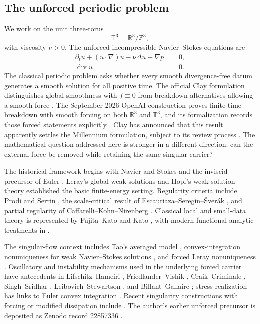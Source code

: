 \documentclass[11pt]{article}
\numberwithin{equation}{section}
\newcommand{\T}{\mathbb T^3}
\newcommand{\R}{\mathbb R}
\newcommand{\diver}{\operatorname{div}}
\begin{document}
\subsection{The unforced periodic problem}
We work on the unit three-torus
\[
\T=\R^3/\mathbb Z^3,
\]
with viscosity \(\nu>0\).  The unforced incompressible Navier--Stokes equations are
\begin{align}
\partial_tu+(u\cdot\nabla)u-\nu\Delta u+\nabla p&=0,\label{eq:NS}\\
\diver u&=0.\label{eq:div}
\end{align}
The classical periodic problem asks whether every smooth divergence-free datum generates a smooth solution for all positive time.  The official Clay formulation distinguishes global smoothness with \(f\equiv0\) from breakdown alternatives allowing a smooth force \cite{FeffermanClay}.  The September 2026 OpenAI construction proves finite-time breakdown with smooth forcing on both \(\R^3\) and \(\T\), and its formalization records those forced statements explicitly \cite{OpenAI2026NS,OpenAIRepo2026}.  Clay has announced that this result apparently settles the Millennium formulation, subject to its review process \cite{ClayAnnouncement2026}.  The mathematical question addressed here is stronger in a different direction: can the external force be removed while retaining the same singular carrier?

The historical framework begins with Navier and Stokes \cite{Navier1827,Stokes1845} and the inviscid precursor of Euler \cite{Euler1757}.  Leray's global weak solutions \cite{Leray1934} and Hopf's weak-solution theory \cite{Hopf1951} established the basic finite-energy setting.  Regularity criteria include Prodi and Serrin \cite{Prodi1959,Serrin1962}, the scale-critical result of Escauriaza--Seregin--\v Sver\'ak \cite{EscauriazaSereginSverak2003}, and partial regularity of Caffarelli--Kohn--Nirenberg \cite{CKN1982}.  Classical local and small-data theory is represented by Fujita--Kato and Kato \cite{FujitaKato1964,Kato1984}, with modern functional-analytic treatments in \cite{Ladyzhenskaya1969,Temam1984,ConstantinFoias1988,Sohr2001,Galdi2011,RobinsonRodrigoSadowski2016}.

The singular-flow context includes Tao's averaged model \cite{Tao2016}, convex-integration nonuniqueness for weak Navier--Stokes solutions \cite{BuckmasterVicol2019}, and forced Leray nonuniqueness \cite{AlbrittonBrueColombo2022}.  Oscillatory and instability mechanisms used in the underlying forced carrier have antecedents in Lifschitz--Hameiri \cite{LifschitzHameiri1991}, Friedlander--Vishik \cite{FriedlanderVishik1991}, Craik--Criminale \cite{CraikCriminale1986}, Singh--Sridhar \cite{SinghSridhar2017}, Leibovich--Stewartson \cite{LeibovichStewartson1983}, and Billant--Gallaire \cite{BillantGallaire2005,BillantGallaire2013}; stress realization has links to Euler convex integration \cite{DaneriSzekelyhidi2017}.  Recent singularity constructions with forcing or modified dissipation include \cite{CordobaMartinezZoroa2023,CordobaMartinezZoroa2024,CordobaMartinezZoroaZheng2026}.  The author's earlier unforced precursor is deposited as Zenodo record 22857336 \cite{NewtonZenodo22857336}.
\end{document}
